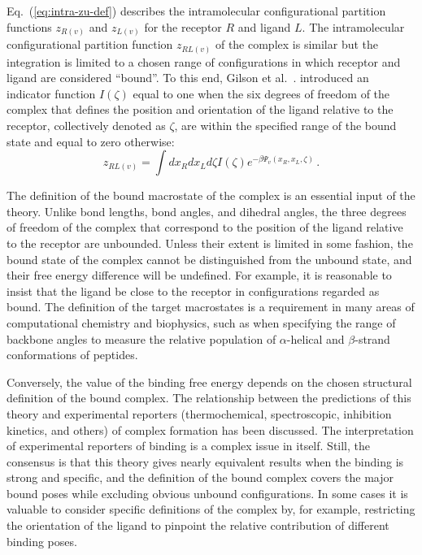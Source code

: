 \documentclass[9pt,bestpractices]{livecoms}
\begin{document}
Eq.~(\ref{eq:intra-zu-def}) describes the intramolecular configurational partition functions $z_{R(v)}$ and $z_{L(v)}$ for the receptor $R$ and ligand $L$. The intramolecular configurational partition function $z_{RL(v)}$ of the complex is similar but the integration is limited to a chosen range of configurations in which receptor and ligand are considered ``bound''. To this end, Gilson et al.~\cite{gilson1997statisticalthermodynamic}. introduced an indicator function $I(\zeta)$ equal to one when the six degrees of freedom of the complex that defines the position and orientation of the ligand relative to the receptor, collectively denoted as $\zeta$, are within the specified range of the bound state and equal to zero otherwise:
\begin{equation}
  z_{RL(v)} = \int dx_R dx_L d\zeta I(\zeta) e^{-\beta \Psi_v(x_R, x_L, \zeta)} \, .
  \label{eq:intra-zRL-def}
\end{equation}

The definition of the bound macrostate of the complex is an essential input of the theory. Unlike bond lengths, bond angles, and dihedral angles, the three degrees of freedom of the complex that correspond to the position of the ligand relative to the receptor are unbounded. Unless their extent is limited in some fashion, the bound state of the complex cannot be distinguished from the unbound state, and their free energy difference will be undefined. For example, it is reasonable to insist that the ligand be close to the receptor in configurations regarded as bound. The definition of the target macrostates is a requirement in many areas of computational chemistry and biophysics, such as when specifying the range of backbone angles to measure the relative population of $\alpha$-helical and $\beta$-strand conformations of peptides.  

Conversely, the value of the binding free energy depends on the chosen structural definition of the bound complex. The relationship between the predictions of this theory and experimental reporters (thermochemical, spectroscopic, inhibition kinetics, and others) of complex formation has been discussed.\cite{gilson1997statisticalthermodynamic,mihailescu2004theory,gallicchio2011recent,simonson2016physical,gallicchio2021comppeptsci} The interpretation of experimental reporters of binding is a complex issue in itself. Still, the consensus is that this theory gives nearly equivalent results when the binding is strong and specific, and the definition of the bound complex covers the major bound poses while excluding obvious unbound configurations. In some cases it is valuable to consider specific definitions of the complex by, for example, restricting the orientation of the ligand to pinpoint the relative contribution of different binding poses.
\end{document}
